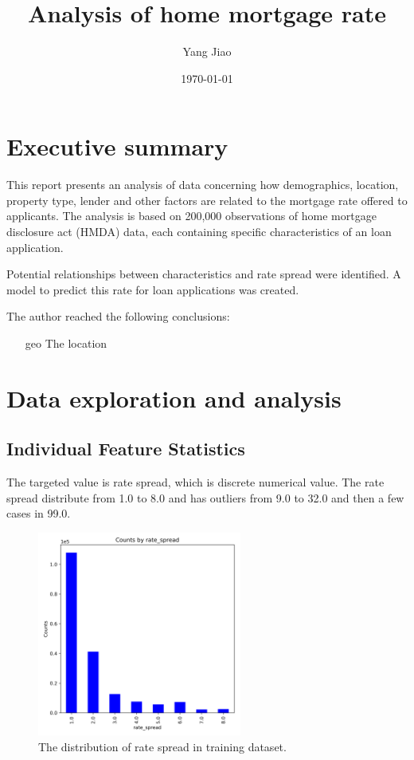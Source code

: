\documentclass[a4paper,10pt,notitlepage]{article}
\begin{document}
\title{Analysis of home mortgage rate}
\author{Yang Jiao}
\date{\today}

\maketitle

\section{Executive summary}  %
This report presents an analysis of data concerning
how demographics, location, property type, lender and other factors are related to the mortgage rate offered to applicants.
The analysis is based on 200,000 observations of home mortgage disclosure act (HMDA) data, each containing specific characteristics of an loan application.

Potential relationships between characteristics and rate spread were identified. 
A model to predict this rate for loan applications was created.

The author reached the following conclusions:
\begin{itemize}
\item[geo] The location
\end{itemize}

\section{Data exploration and analysis}


\subsection{Individual Feature Statistics}

The targeted value is rate spread, which is discrete numerical value. 
The rate spread distribute from 1.0 to 8.0 and has outliers from 9.0 to 32.0 and then a few cases in 99.0. 
\begin{figure}[H]
\centering
\includegraphics[width=0.6\textwidth]{rate_spread_counts.png}
\caption{The distribution of rate spread in training dataset.}
\label{fig:rate_spread}
\end{figure}
\end{document}
